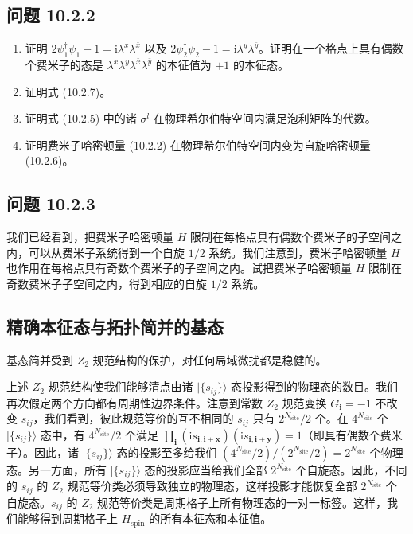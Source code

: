\subsection*{问题 10.2.2}

\begin{enumerate}
\item[(a)] 证明 $2\psi_1^\dagger\psi_1-1=\mathrm{i}\lambda^{x}\lambda^{\bar{x}}$ 以及 $2\psi_2^\dagger\psi_2-1=\mathrm{i}\lambda^{y}\lambda^{\bar{y}}$。证明在一个格点上具有偶数个费米子的态是 $\lambda^{x}\lambda^{y}\lambda^{\bar{x}}\lambda^{\bar{y}}$ 的本征值为 $+1$ 的本征态。
\item[(b)] 证明式 (10.2.7)。
\item[(c)] 证明式 (10.2.5) 中的诸 $\sigma^{l}$ 在物理希尔伯特空间内满足泡利矩阵的代数。
\item[(d)] 证明费米子哈密顿量 (10.2.2) 在物理希尔伯特空间内变为自旋哈密顿量 (10.2.6)。
\end{enumerate}

\subsection*{问题 10.2.3}

我们已经看到，把费米子哈密顿量 $H$ 限制在每格点具有偶数个费米子的子空间之内，可以从费米子系统得到一个自旋 $1/2$ 系统。我们注意到，费米子哈密顿量 $H$ 也作用在每格点具有奇数个费米子的子空间之内。试把费米子哈密顿量 $H$ 限制在奇数费米子子空间之内，得到相应的自旋 $1/2$ 系统。

\subsection{精确本征态与拓扑简并的基态}

\begin{keypoints}
\item 基态简并受到 $Z_2$ 规范结构的保护，对任何局域微扰都是稳健的。
\end{keypoints}

上述 $Z_2$ 规范结构使我们能够清点由诸 $|\{s_{ij}\}\rangle$ 态投影得到的物理态的数目。我们再次假定两个方向都有周期性边界条件。注意到常数 $Z_2$ 规范变换 $G_{\pmb{i}}=-1$ 不改变 $s_{ij}$，我们看到，彼此规范等价的互不相同的 $s_{ij}$ 只有 $2^{N_{\text{site}}}/2$ 个。在 $4^{N_{\text{site}}}$ 个 $|\{s_{ij}\}\rangle$ 态中，有 $4^{N_{\text{site}}}/2$ 个满足 $\prod_{\pmb{i}}(\mathrm{i}s_{\pmb{i},\pmb{i}+\pmb{x}})(\mathrm{i}s_{\pmb{i},\pmb{i}+\pmb{y}})=1$（即具有偶数个费米子）。因此，诸 $|\{s_{ij}\}\rangle$ 态的投影至多给我们 $(4^{N_{\text{site}}}/2)\allowbreak/(2^{N_{\text{site}}}/2)\allowbreak=2^{N_{\text{site}}}$ 个物理态。另一方面，所有 $|\{s_{ij}\}\rangle$ 态的投影应当给我们全部 $2^{N_{\text{site}}}$ 个自旋态。因此，不同的 $s_{ij}$ 的 $Z_2$ 规范等价类必须导致独立的物理态，这样投影才能恢复全部 $2^{N_{\text{site}}}$ 个自旋态。$s_{ij}$ 的 $Z_2$ 规范等价类是周期格子上所有物理态的一对一标签。这样，我们能够得到周期格子上 $H_{\text{spin}}$ 的所有本征态和本征值。

